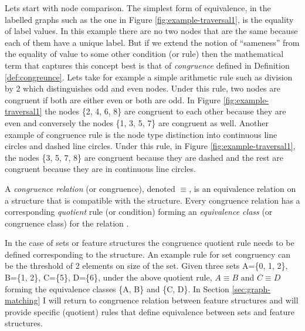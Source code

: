 Lets start with node comparison. The simplest form of equivalence, in the labelled graphs such as the one in Figure \ref{fig:example-traversal1}, is the equality of label values. In this example there are no two nodes that are the same because each of them have a unique label. But if we extend the notion of ``sameness'' from the equality of value to some other condition (or rule) then the mathematical term that captures this concept best is that of \textit{congruence} defined in Definition \ref{def:congreunce}. Lets take for example a simple arithmetic rule such as division by 2 which distinguishes odd and even nodes. Under this rule, two nodes are congruent if both are either even or both are odd. In Figure \ref{fig:example-traversal1} the nodes \{2, 4, 6, 8\} are congruent to each other because they are even and conversely the nodes \{1, 3, 5, 7\} are congruent as well. Another example of congruence rule is the node type distinction into continuous line circles and dashed line circles. Under this rule, in Figure \ref{fig:example-traversal1}, the nodes \{3, 5, 7, 8\} are congruent because they are dashed and the rest are congruent because they are in continuous line circles. 

\begin{definition}[Congruence]\label{def:congreunce}
    A \textit{congruence relation} (or congruence), denoted $\equiv$, is an equivalence relation on a structure that is compatible with the structure. Every congruence relation has a corresponding \textit{quotient} rule (or condition) forming an \textit{equivalence class} (or congruence class) for the relation \citep[26-27]{hungerford1980algebra}.
\end{definition}

In the case of sets or feature structures the congruence quotient rule needs to be defined corresponding to the structure. An example rule for set congruency can be the threshold of 2 elements on size of the set. Given three sets A=\{0, 1, 2\}, B=\{1, 2\}, C=\{5\}, D=\{6\}, under the above quotient rule, $A \equiv B$ and $C \equiv D$ forming the equivalence classes \{A, B\} and \{C, D\}. In Section \ref{sec:graph-matching} I will return to congruence relation between feature structures and will provide specific (quotient) rules that define equivalence between sets and feature structures. 

